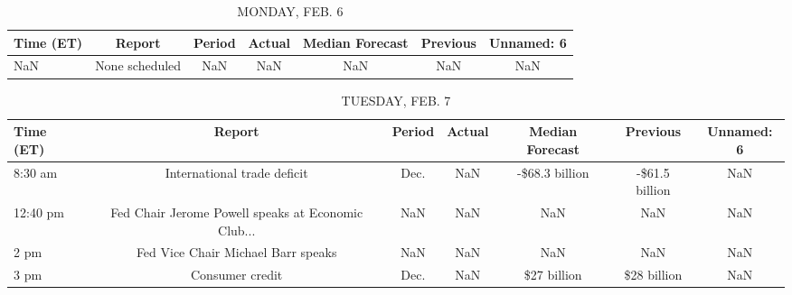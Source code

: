 \documentclass{article}%
\begin{document}
%
\normalsize%


\begin{table}[htbp]%
\caption{MONDAY, FEB. 6}%
\centering%
\begin{adjustbox}{width=1\textwidth}%
\begin{tabular}{lcccccc}
\toprule
Time (ET) &         Report & Period & Actual & Median Forecast & Previous & Unnamed: 6 \\
\midrule
      NaN & None scheduled &    NaN &    NaN &             NaN &      NaN &        NaN \\
\bottomrule
\end{tabular}
%
\end{adjustbox}%
\end{table}

%


\begin{table}[htbp]%
\caption{TUESDAY, FEB. 7}%
\centering%
\begin{adjustbox}{width=1\textwidth}%
\begin{tabular}{lcccccc}
\toprule
Time (ET) &                                             Report & Period & Actual & Median Forecast &       Previous & Unnamed: 6 \\
\midrule
  8:30 am &                        International trade deficit &   Dec. &    NaN &  -\$68.3 billion & -\$61.5 billion &        NaN \\
 12:40 pm & Fed Chair Jerome Powell speaks at Economic Club... &    NaN &    NaN &             NaN &            NaN &        NaN \\
     2 pm &                 Fed Vice Chair Michael Barr speaks &    NaN &    NaN &             NaN &            NaN &        NaN \\
     3 pm &                                    Consumer credit &   Dec. &    NaN &     \$27 billion &    \$28 billion &        NaN \\
\bottomrule
\end{tabular}
%
\end{adjustbox}%
\end{table}

%
\end{document}
